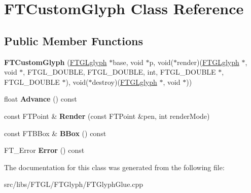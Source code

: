 \hypertarget{class_f_t_custom_glyph}{
\section{FTCustomGlyph Class Reference}
\label{class_f_t_custom_glyph}
}
\subsection*{Public Member Functions}
\begin{DoxyCompactItemize}
\item 
\hypertarget{class_f_t_custom_glyph_a43e4bfa9d8ccb5ae4d0e9c38cf7f01c1}{
{\bfseries FTCustomGlyph} (\hyperlink{struct___f_t_g_lglyph}{FTGLglyph} $\ast$base, void $\ast$p, void($\ast$render)(\hyperlink{struct___f_t_g_lglyph}{FTGLglyph} $\ast$, void $\ast$, FTGL\_\-DOUBLE, FTGL\_\-DOUBLE, int, FTGL\_\-DOUBLE $\ast$, FTGL\_\-DOUBLE $\ast$), void($\ast$destroy)(\hyperlink{struct___f_t_g_lglyph}{FTGLglyph} $\ast$, void $\ast$))}
\label{class_f_t_custom_glyph_a43e4bfa9d8ccb5ae4d0e9c38cf7f01c1}

\item 
\hypertarget{class_f_t_custom_glyph_aa8f17e3a9547eafed913e2b8f9b70958}{
float {\bfseries Advance} () const }
\label{class_f_t_custom_glyph_aa8f17e3a9547eafed913e2b8f9b70958}

\item 
\hypertarget{class_f_t_custom_glyph_a29285cf4a9b5476a80b01e1678272bd6}{
const FTPoint \& {\bfseries Render} (const FTPoint \&pen, int renderMode)}
\label{class_f_t_custom_glyph_a29285cf4a9b5476a80b01e1678272bd6}

\item 
\hypertarget{class_f_t_custom_glyph_aebed1d1515a24d6410f4c3f44686b75c}{
const FTBBox \& {\bfseries BBox} () const }
\label{class_f_t_custom_glyph_aebed1d1515a24d6410f4c3f44686b75c}

\item 
\hypertarget{class_f_t_custom_glyph_a8a74b76186fb02da48849c3c094fb72e}{
FT\_\-Error {\bfseries Error} () const }
\label{class_f_t_custom_glyph_a8a74b76186fb02da48849c3c094fb72e}

\end{DoxyCompactItemize}


The documentation for this class was generated from the following file:\begin{DoxyCompactItemize}
\item 
src/libs/FTGL/FTGlyph/FTGlyphGlue.cpp\end{DoxyCompactItemize}
